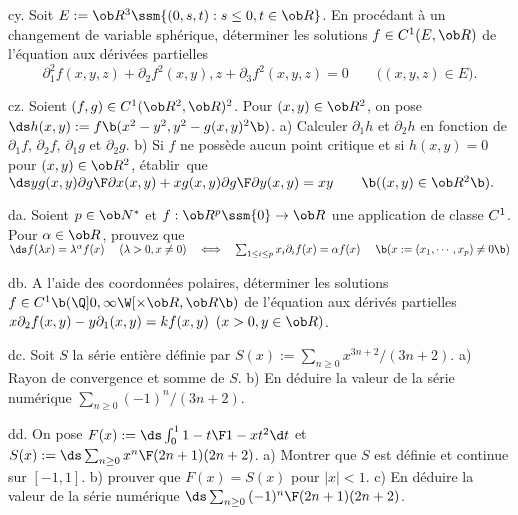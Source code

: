 \exo [Level=2,Fight=1,Learn=1,Type=\Exercices,Field=\FonctionsDePlusieursVariables, Origin=] cy. 
Soit $E:=\ob R^3\ssm\{(0,s,t):s\le 0,t\in\ob R\}$. En procédant à un changement de variable sphérique, 
déterminer les solutions $f\in\sc C^1(E,\ob R)$ de l'équation aux dérivées partielles 
$$
\partial_1^2f(x,y,z)+\partial_2f^2(x,y),z+\partial_3f^2(x,y,z)=0
\qquad\big((x,y,z)\in E\big).
$$ 

\exo [Level=2,Fight=1,Learn=1,Type=\Exercices,Field=\FonctionsDePlusieursVariables, Origin=]  cz. 
Soient $(f,g)\in\sc C^1(\ob R^2,\ob R)^2$. Pour $(x,y)\in\ob R^2$, on pose 
$\ds h(x,y):=f\b(x^2-y^2,y^2-g(x,y)^2\b)$. \pn
a) Calculer $\partial_1h$ et $\partial_2h$ en fonction de $\partial_1f$, 
$\partial_2f$, $\partial_1g$ et $\partial_2g$. \pn
b) Si $f$ ne possède aucun point critique et si $h(x,y)=0$ 
pour $(x,y)\in\ob R^2$, établir~que 
\medskip
\hfill
$\ds 
yg(x,y){\partial g\F\partial x}(x,y)+xg(x,y){\partial g\F\partial y}(x,y)=xy\qquad\b((x,y)\in\ob R^2\b). 
$\hfill\null

\exo [Level=2,Fight=3,Learn=1,Type=\Exercices,Field=\FonctionsDePlusieursVariables, Origin=] da. 
Soient $p\in\ob N^*$ et $f:\ob R^p\ssm\{0\}\to\ob R$ 
une application de classe $\sc C^1$. Pour $\alpha\in\ob R$, prouvez que 
\medskip\hfill
$\ds 
f(\lambda x)=\lambda^\alpha f(x)\quad\ (\lambda>0,x\neq 0)\quad\Longleftrightarrow\quad 
 \sum_{1\le i\le p}x_i\partial_if(x)=\alpha f(x)\quad\ \b(x:=(x_1,\cdots,x_p)\neq0\b)
$\hfill\null

\exo [Level=2,Fight=2,Learn=2,Type=\Exercices,Field=\EquationsAuxDérivéesPartielles, Origin=] db. 
A l'aide des coordonnées polaires, déterminer 
les solutions $f\in\sc C^1\b(\Q]0,\infty\W[\times \ob R,\ob R\b)$ de l'équation aux dérivés partielles $x\partial_2f(x,y)-y\partial_1(x,y)=kf(x,y)\ \,(x>0,y\in\ob R)$. 

\exo [Level=2,Fight=1,Learn=1,Type=\Exercices,Field=\SériesEntières, Origin=] dc. 
Soit $S$ la série entière définie par $S(x):=\sum_{n\ge0}x^{3n+2}/(3n+2)$. 
a) Rayon de convergence et somme de $S$. \pn
b) En déduire la valeur de la série numérique $\sum_{n\ge0}(-1)^n/(3n+2)$. 

\exo [Level=2,Fight=2,Learn=2,Type=\Exercices,Field=\SériesEntières, Origin=] dd. 
On pose $F(x):=\ds\int_0^1{1-t\F1-xt^2}\d t$ et $S(x):=\ds\sum_{n\ge0}{x^n\F(2n+1)(2n+2)}$. \pn
a) Montrer que $S$ est définie et continue sur $[-1,1]$. \pn
b) prouver que $F(x)=S(x)$ pour $|x|<1$. \pn
c) En déduire la valeur de la série numérique $\ds\sum_{n\ge0}{(-1)^n\F(2n+1)(2n+2)}$. 

